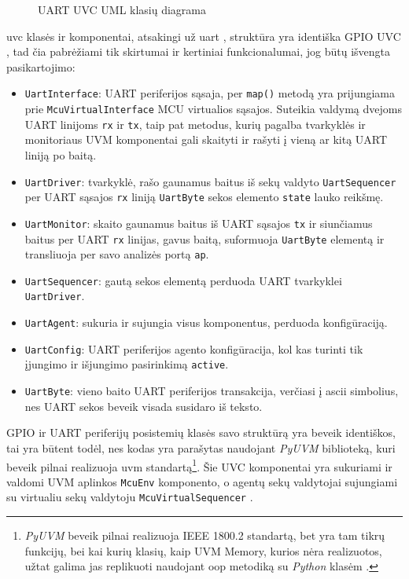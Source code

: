 \begin{figure}[H]
	
	\caption{UART UVC UML klasių diagrama}
	\label{fig:uml_class_tb_uvc_uart}
\end{figure}

\gls{uvc} klasės ir komponentai, atsakingi už \gls{uart}  \pav{\ref{fig:uml_class_tb_uvc_uart}}, struktūra yra identiška GPIO UVC \pav{\ref{fig:uml_class_tb_uvc_gpio}}, tad čia pabrėžiami tik skirtumai ir kertiniai funkcionalumai, jog būtų išvengta pasikartojimo:

\begin{itemize}
	\item \texttt{UartInterface}: UART periferijos sąsaja, per \texttt{map()} metodą yra prijungiama prie \texttt{McuVirtualInterface} MCU virtualios sąsajos. Suteikia valdymą dvejoms UART linijoms \texttt{rx} ir \texttt{tx}, taip pat metodus, kurių pagalba tvarkyklės ir monitoriaus UVM komponentai gali skaityti ir rašyti į vieną ar kitą UART liniją po baitą.
	\item \texttt{UartDriver}: tvarkyklė, rašo gaunamus baitus iš sekų valdyto \texttt{UartSequencer} per UART sąsajos \texttt{rx} liniją \texttt{UartByte} sekos elemento \texttt{state} lauko reikšmę.
	\item \texttt{UartMonitor}: skaito gaunamus baitus iš UART sąsajos \texttt{tx} ir siunčiamus baitus per UART \texttt{rx} linijas, gavus baitą, suformuoja \texttt{UartByte} elementą ir transliuoja per savo analizės portą \texttt{ap}.
	\item \texttt{UartSequencer}: gautą sekos elementą perduoda UART tvarkyklei \texttt{UartDriver}.
	\item \texttt{UartAgent}: sukuria ir sujungia visus komponentus, perduoda konfigūraciją.
	\item \texttt{UartConfig}: UART periferijos agento konfigūracija, kol kas turinti tik įjungimo ir išjungimo pasirinkimą \texttt{active}.
	\item \texttt{UartByte}: vieno baito UART periferijos transakcija, verčiasi į \gls{ascii} simbolius, nes UART sekos beveik visada susidaro iš teksto.
\end{itemize}

GPIO ir UART periferijų posistemių klasės savo struktūrą yra beveik identiškos, tai yra būtent todėl, nes kodas yra parašytas naudojant \textit{PyUVM} biblioteką, kuri beveik pilnai realizuoja \gls{uvm} standartą\footnote{\textit{PyUVM} beveik pilnai realizuoja IEEE 1800.2 standartą, bet yra tam tikrų funkcijų, bei kai kurių klasių, kaip UVM Memory, kurios nėra realizuotos, užtat galima jas replikuoti naudojant \gls{oop} metodiką su \textit{Python} klasėm \cite{pyuvm}.}. Šie UVC komponentai yra sukuriami ir valdomi UVM aplinkos \texttt{McuEnv} komponento, o agentų sekų valdytojai sujungiami su virtualiu sekų valdytoju \texttt{McuVirtualSequencer} \pav{\ref{fig:uml_class_tb_env_uvc}}.

